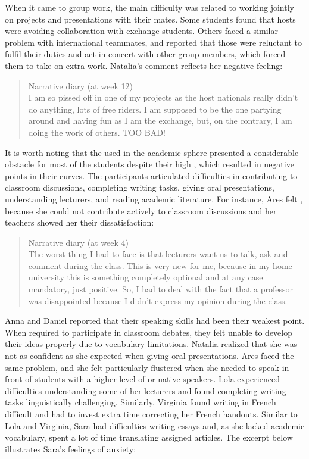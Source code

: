 \documentclass[output=paper]{langsci/langscibook}
\begin{document}
When it came to group work, the main difficulty was related to working jointly on projects and presentations with their mates. Some students found that hosts were avoiding collaboration with exchange students. Others faced a similar problem with international teammates, and reported that those were reluctant to fulfil their duties and act in concert with other group members, which forced them to take on extra work. Natalia’s comment reflects her negative feeling:

\begin{quote}
Narrative diary (at week 12)
\smallskip\\
I am so pissed off in one of my projects as the host nationals really didn’t do anything, lots of free riders. I am supposed to be the one partying around and having fun as I am the exchange, but, on the contrary, I am doing the work of others. TOO BAD!
\end{quote}

It is worth noting that the  used in the academic sphere presented a considerable obstacle for most of the students despite their high  , which resulted in negative  points in their curves. The participants articulated difficulties in contributing to classroom discussions, completing writing tasks, giving oral presentations, understanding lecturers, and reading academic literature. For instance, Ares felt , because she could not contribute actively to classroom discussions and her teachers showed her their dissatisfaction:

\begin{quote}
Narrative diary (at week 4)
\smallskip\\
The worst thing I had to face is that lecturers want us to talk, ask and comment during the class. This is very new for me, because in my home university this is something completely optional and at any case mandatory, just positive. So, I had to deal with the fact that a professor was disappointed because I didn’t express my opinion during the class.
\end{quote}

 Anna and Daniel reported that their speaking skills had been their weakest point. When required to participate in classroom debates, they felt unable to develop their ideas properly due to vocabulary limitations. Natalia realized that she was not as confident as she expected when giving oral presentations. Ares faced the same problem, and she felt particularly flustered when she needed to speak in front of students with a higher level of  or native speakers. Lola experienced difficulties understanding some of her lecturers and found completing writing tasks linguistically challenging. Similarly, Virginia found writing in French difficult and had to invest extra time correcting her French handouts. Similar to Lola and Virginia, Sara had difficulties writing essays and, as she lacked academic vocabulary, spent a lot of time translating assigned articles. The excerpt below illustrates Sara’s feelings of anxiety:
\end{document}
